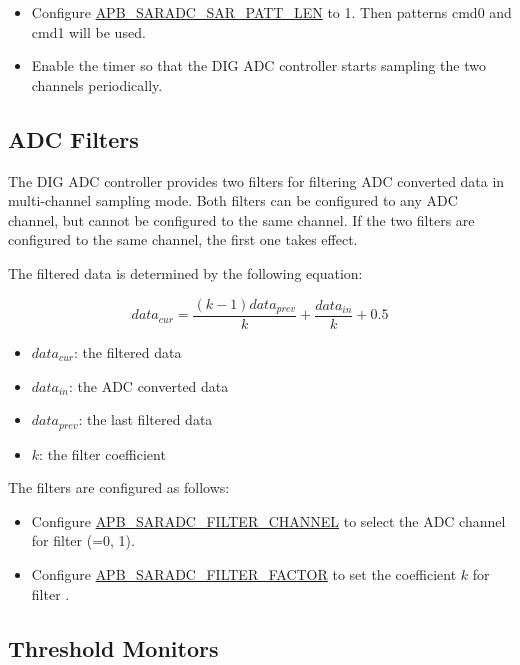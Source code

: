 \documentclass[main\_\_EN.tex]{subfiles}
\begin{document}
\begin{itemize}
    \item Configure \hyperref[fielddesc:APBSARADCSARPATTLEN]{APB\_SARADC\_SAR\_PATT\_LEN} to 1. Then patterns cmd0 and cmd1 will be used. 
    \item Enable the timer so that the DIG ADC controller starts sampling the two channels periodically.
\end{itemize}

\subsection{ADC Filters}\label{sec:adc_filter}

The DIG ADC controller provides two filters for filtering ADC converted data in multi-channel sampling mode. Both filters can be configured to any ADC channel, but cannot be configured to the same channel. If the two filters are configured to the same channel, the first one takes effect.

The filtered data is determined by the following equation:

\[data_{cur} = \frac{(k-1)data_{prev}}{k}+\frac{data_{in}}{k}+0.5\]

\begin{itemize}
    \item \(data_{cur}\): the filtered data
    \item \(data_{in}\): the ADC converted data
    \item \(data_{prev}\): the last filtered data
    \item \(k\): the filter coefficient
\end{itemize}

The filters are configured as follows:

\begin{itemize}
\item Configure \hyperref[fielddesc:APBSARADCFILTERCHANNEL1]{APB\_SARADC\_FILTER\_CHANNEL} to select the ADC channel for filter  (=0, 1).
\item Configure \hyperref[fielddesc:APBSARADCFILTERFACTOR1]{APB\_SARADC\_FILTER\_FACTOR} to set the coefficient \(k\) for filter .
\end{itemize}

\subsection{Threshold Monitors}\label{sec:adc_threshold}
\end{document}
